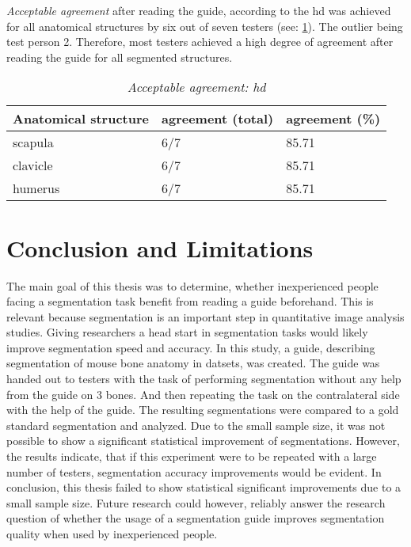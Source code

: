 \noindent
\textit{Acceptable agreement} after reading the guide, according to the \acrshort{hd} was achieved for all anatomical structures by six out of seven testers (see: \cref{tab:hd-acceptable}).
The outlier being test person 2.
Therefore, most testers achieved a high degree of agreement after reading the guide for all segmented structures.
\begin{table}[ht]
	\begin{center}
		\begin{tabular}{l l l}
			\textbf{Anatomical structure} & agreement (total) & agreement (\%) \\
			\hline
			scapula                       & 6/7               & 85.71          \\
			clavicle                      & 6/7               & 85.71          \\
			humerus                       & 6/7               & 85.71          \\
		\end{tabular}
		\caption{\textit{Acceptable agreement: \acrshort{hd}}}\label{tab:hd-acceptable}
	\end{center}
\end{table}


\chapter{Conclusion and Limitations}\label{c:conclusion}
The main goal of this thesis was to determine, whether inexperienced people facing a \mct\space segmentation task benefit from reading a guide beforehand.
This is relevant because segmentation is an important step in quantitative image analysis studies.
Giving researchers a head start in segmentation tasks would likely improve segmentation speed and accuracy.
In this study, a guide, describing segmentation of mouse bone anatomy in \mct\space datsets, was created.
The guide was handed out to testers with the task of performing segmentation without any help from the guide on 3 bones.
And then repeating the task on the contralateral side with the help of the guide.
The resulting segmentations were compared to a gold standard segmentation and analyzed.
Due to the small sample size, it was not possible to show a significant statistical improvement of segmentations.
However, the results indicate, that if this experiment were to be repeated with a large number of testers, segmentation accuracy improvements would be evident.
In conclusion, this thesis failed to show statistical significant improvements due to a small sample size.
Future research could however, reliably answer the research question of whether the usage of a segmentation guide improves segmentation quality when used by inexperienced people.



